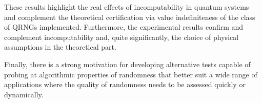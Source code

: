 \documentclass[l1pt]{elsarticle}
\begin{document}
These results highlight the real effects of incomputability in quantum systems and complement the theoretical certification via value indefiniteness of the class of QRNGs implemented. Furthermore,  the experimental results confirm and complement incomputability and, quite significantly, the choice of physical assumptions in the theoretical part.

Finally, there is a strong motivation for developing alternative tests capable of probing at algorithmic properties of randomness that better suit a wide range of applications where the quality of randomness needs to be assessed quickly or dynamically.



\end{document}
